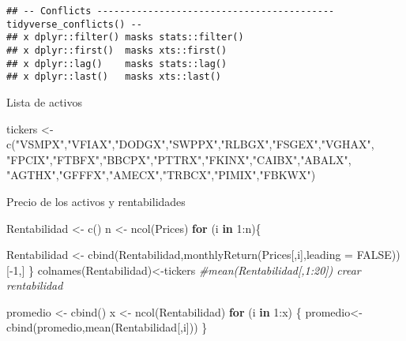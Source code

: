 \documentclass[
]{article}
\newenvironment{Shaded}{\begin{snugshade}}{\end{snugshade}}
\newcommand{\AttributeTok}[1]{\textcolor[rgb]{0.77,0.63,0.00}{#1}}
\newcommand{\CommentTok}[1]{\textcolor[rgb]{0.56,0.35,0.01}{\textit{#1}}}
\newcommand{\ConstantTok}[1]{\textcolor[rgb]{0.00,0.00,0.00}{#1}}
\newcommand{\ControlFlowTok}[1]{\textcolor[rgb]{0.13,0.29,0.53}{\textbf{#1}}}
\newcommand{\DecValTok}[1]{\textcolor[rgb]{0.00,0.00,0.81}{#1}}
\newcommand{\FunctionTok}[1]{\textcolor[rgb]{0.00,0.00,0.00}{#1}}
\newcommand{\NormalTok}[1]{#1}
\newcommand{\OtherTok}[1]{\textcolor[rgb]{0.56,0.35,0.01}{#1}}
\newcommand{\SpecialCharTok}[1]{\textcolor[rgb]{0.00,0.00,0.00}{#1}}
\newcommand{\StringTok}[1]{\textcolor[rgb]{0.31,0.60,0.02}{#1}}
\begin{document}
\begin{verbatim}
## -- Conflicts ------------------------------------------ tidyverse_conflicts() --
## x dplyr::filter() masks stats::filter()
## x dplyr::first()  masks xts::first()
## x dplyr::lag()    masks stats::lag()
## x dplyr::last()   masks xts::last()
\end{verbatim}

Lista de activos

\begin{Shaded}
\begin{Highlighting}[]
\NormalTok{tickers }\OtherTok{\textless{}{-}} \FunctionTok{c}\NormalTok{(}\StringTok{"VSMPX"}\NormalTok{,}\StringTok{"VFIAX"}\NormalTok{,}\StringTok{"DODGX"}\NormalTok{,}\StringTok{"SWPPX"}\NormalTok{,}\StringTok{"RLBGX"}\NormalTok{,}\StringTok{"FSGEX"}\NormalTok{,}\StringTok{"VGHAX"}\NormalTok{,}
             \StringTok{"FPCIX"}\NormalTok{,}\StringTok{"FTBFX"}\NormalTok{,}\StringTok{"BBCPX"}\NormalTok{,}\StringTok{"PTTRX"}\NormalTok{,}\StringTok{"FKINX"}\NormalTok{,}\StringTok{"CAIBX"}\NormalTok{,}\StringTok{"ABALX"}\NormalTok{,}
             \StringTok{"AGTHX"}\NormalTok{,}\StringTok{"GFFFX"}\NormalTok{,}\StringTok{"AMECX"}\NormalTok{,}\StringTok{"TRBCX"}\NormalTok{,}\StringTok{"PIMIX"}\NormalTok{,}\StringTok{"FBKWX"}\NormalTok{)}
\end{Highlighting}
\end{Shaded}

Precio de los activos y rentabilidades

\begin{Shaded}
\begin{Highlighting}[]
\NormalTok{Rentabilidad }\OtherTok{\textless{}{-}} \FunctionTok{c}\NormalTok{()}
\NormalTok{n }\OtherTok{\textless{}{-}} \FunctionTok{ncol}\NormalTok{(Prices)}
\ControlFlowTok{for}\NormalTok{ (i }\ControlFlowTok{in} \DecValTok{1}\SpecialCharTok{:}\NormalTok{n)\{}

\NormalTok{    Rentabilidad }\OtherTok{\textless{}{-}} \FunctionTok{cbind}\NormalTok{(Rentabilidad,}\FunctionTok{monthlyReturn}\NormalTok{(Prices[,i],}\AttributeTok{leading =} \ConstantTok{FALSE}\NormalTok{))[}\SpecialCharTok{{-}}\DecValTok{1}\NormalTok{,]}
\NormalTok{\}}
\FunctionTok{colnames}\NormalTok{(Rentabilidad)}\OtherTok{\textless{}{-}}\NormalTok{tickers  }
\CommentTok{\#mean(Rentabilidad[,1:20]) crear rentabilidad }
\end{Highlighting}
\end{Shaded}

\begin{Shaded}
\begin{Highlighting}[]
\NormalTok{promedio }\OtherTok{\textless{}{-}} \FunctionTok{cbind}\NormalTok{()}
\NormalTok{x }\OtherTok{\textless{}{-}} \FunctionTok{ncol}\NormalTok{(Rentabilidad)}
\ControlFlowTok{for}\NormalTok{ (i }\ControlFlowTok{in} \DecValTok{1}\SpecialCharTok{:}\NormalTok{x) \{}
\NormalTok{  promedio}\OtherTok{\textless{}{-}} \FunctionTok{cbind}\NormalTok{(promedio,}\FunctionTok{mean}\NormalTok{(Rentabilidad[,i]))}
\NormalTok{\}}
\end{Highlighting}
\end{Shaded}
\end{document}
